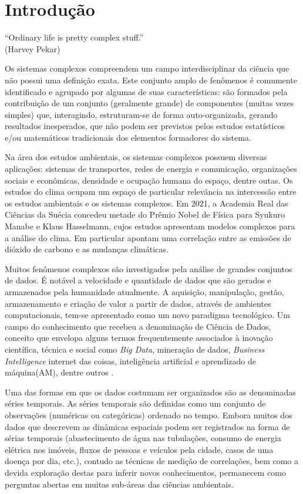 \chapter{Introdução}
\label{cap:introducao}


\begin{flushright}
``Ordinary life is pretty complex stuff.''\\
(Harvey Pekar)
\end{flushright}

Os sistemas complexos compreendem um campo interdisciplinar da ciência que não possui uma definição exata. Este conjunto amplo de fenômenos é comumente identificado e agrupado por algumas de suas características: são formados pela contribuição de um conjunto (geralmente grande) de componentes (muitas vezes simples) que, interagindo, estruturam-se de forma auto-organizada, gerando resultados inesperados, que não podem ser previstos pelos estudos estatísticos e/ou matemáticos tradicionais dos elementos formadores do sistema.

Na área dos estudos ambientais, os sistemas complexos possuem diversas aplicações: sistemas de transportes, redes de energia e comunicação, organizações sociais e econômicas, densidade e ocupação humana do espaço, dentre outas. Os estudos do clima ocupam um espaço de particular relevância na intercessão entre os estudos ambientais e os sistemas complexos. Em 2021, a Academia Real das Ciências da Suécia concedeu metade do Prêmio Nobel de Física para Syukuro Manabe e Klaus Hasselmann, cujos estudos apresentam modelos complexos para a análise do clima. Em particular apontam uma correlação entre as emissões de dióxido de carbono e as mudanças climáticas.

Muitos fenômenos complexos são investigados pela análise de grandes conjuntos de dados. É notável a velocidade e quantidade de dados que são gerados e armazenados pela humanidade atualmente. A aquisição, manipulação, gestão, armazenamento e criação de valor a partir de dados, através de ambientes computacionais, tem-se apresentado como um novo paradigma tecnológico. Um campo do conhecimento que recebeu a denominação de Ciência de Dados, conceito que envelopa alguns termos frequentemente associados à inovação científica, técnica e social como \emph{Big Data}, mineração de dados, \emph{Business Intelligence} internet das coisas, inteligência artificial e aprendizado de máquina(AM), dentre outros \cite[p. 12-13]{EMCdata2015}.

Uma das formas em que os dados costumam ser organizados são as denominadas séries temporais. As séries temporais são definidas como um conjunto de observações (numéricas ou categóricas) ordenado no tempo.  Embora muitos dos dados que descrevem as dinâmicas espaciais podem ser registrados na forma de sérias temporais (abastecimento de água nas tubulações, consumo de energia elétrica nos imóveis, fluxos de pessoas e veículos pela cidade, casos de uma doença por dia, etc.), contudo as técnicas de medição de correlações, bem como a devida exploração destas para inferir novos conhecimentos, permanecem como perguntas abertas em muitas sub-áreas das ciências ambientais\cite{Bermudez-Edo2018}.

